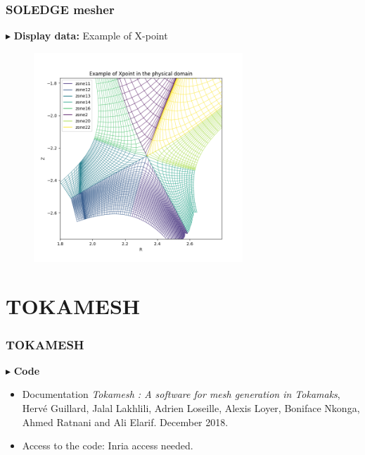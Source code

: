 \documentclass[t,10pt,a3paper]{beamer} %
\newenvironment{changemargin}[2]{%
 \begin{list}{}{%
     \setlength{\topsep}{0pt}%
     \setlength{\leftmargin}{#1}%
     \setlength{\rightmargin}{#2}%
     \setlength{\listparindent}{\parindent}%
     \setlength{\itemindent}{\parindent}%
     \setlength{\parsep}{\parskip}%
   }%
\item[]}{\end{list}}
\begin{document}
\begin{frame} %
\frametitle{\color{vert}\textbf{SOLEDGE mesher}}
\footnotesize	

{\color{vert}$\blacktriangleright$ }
\textbf{Display data:} Example of X-point
\begin{changemargin}{-2cm}{-2cm} 
\begin{center}
\begin{figure}[!h]
	\includegraphics[width=0.7\textwidth]{images/Example_of_Xpoint.png}
\end{figure}	
\end{center}
\end{changemargin}

\end{frame}


\section{TOKAMESH}

\begin{frame} %
\frametitle{\color{vert}\textbf{TOKAMESH}}
\footnotesize	

\vspace*{0.25cm}
{\color{vert}$\blacktriangleright$ }
\textbf{Code}

\begin{itemize}
	\item Documentation \textit{Tokamesh : A software for mesh generation in Tokamaks}, Hervé Guillard, Jalal Lakhlili, Adrien Loseille, Alexis Loyer, Boniface Nkonga, Ahmed Ratnani and Ali Elarif. December 2018. 
	\item Access to the code: Inria access needed. 
\end{itemize}

\end{frame}
\end{document}
